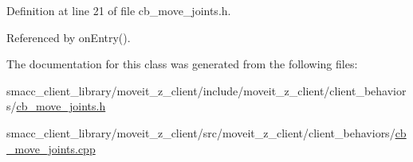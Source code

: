 Definition at line 21 of file cb\+\_\+move\+\_\+joints.\+h.



Referenced by on\+Entry().



The documentation for this class was generated from the following files\+:\begin{DoxyCompactItemize}
\item 
smacc\+\_\+client\+\_\+library/moveit\+\_\+z\+\_\+client/include/moveit\+\_\+z\+\_\+client/client\+\_\+behaviors/\hyperlink{cb__move__joints_8h}{cb\+\_\+move\+\_\+joints.\+h}\item 
smacc\+\_\+client\+\_\+library/moveit\+\_\+z\+\_\+client/src/moveit\+\_\+z\+\_\+client/client\+\_\+behaviors/\hyperlink{cb__move__joints_8cpp}{cb\+\_\+move\+\_\+joints.\+cpp}\end{DoxyCompactItemize}
